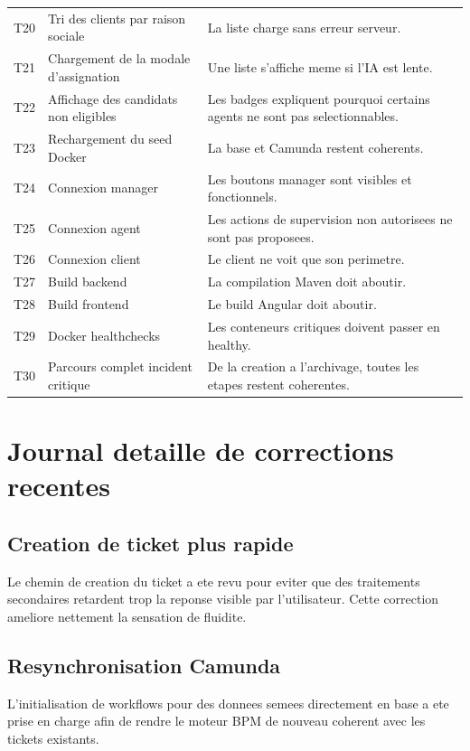 \documentclass[12pt,a4paper,oneside]{report}
\begin{document}
\begin{longtable}{>{\raggedright\arraybackslash}p{1.2cm} >{\raggedright\arraybackslash}p{4.2cm} >{\raggedright\arraybackslash}p{7.6cm}}
T20 & Tri des clients par raison sociale & La liste charge sans erreur serveur. \\
T21 & Chargement de la modale d'assignation & Une liste s'affiche meme si l'IA est lente. \\
T22 & Affichage des candidats non eligibles & Les badges expliquent pourquoi certains agents ne sont pas selectionnables. \\
T23 & Rechargement du seed Docker & La base et Camunda restent coherents. \\
T24 & Connexion manager & Les boutons manager sont visibles et fonctionnels. \\
T25 & Connexion agent & Les actions de supervision non autorisees ne sont pas proposees. \\
T26 & Connexion client & Le client ne voit que son perimetre. \\
T27 & Build backend & La compilation Maven doit aboutir. \\
T28 & Build frontend & Le build Angular doit aboutir. \\
T29 & Docker healthchecks & Les conteneurs critiques doivent passer en healthy. \\
T30 & Parcours complet incident critique & De la creation a l'archivage, toutes les etapes restent coherentes. \\
\bottomrule
\end{longtable}

\chapter{Journal detaille de corrections recentes}

\section{Creation de ticket plus rapide}

Le chemin de creation du ticket a ete revu pour eviter que des traitements secondaires retardent trop la reponse visible par l'utilisateur. Cette correction ameliore nettement la sensation de fluidite.

\section{Resynchronisation Camunda}

L'initialisation de workflows pour des donnees semees directement en base a ete prise en charge afin de rendre le moteur BPM de nouveau coherent avec les tickets existants.
\end{document}
